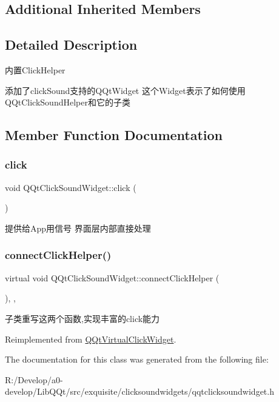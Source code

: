\subsection*{Additional Inherited Members}


\subsection{Detailed Description}
内置\+Click\+Helper

添加了click\+Sound支持的\+Q\+Qt\+Widget 这个\+Widget表示了如何使用\+Q\+Qt\+Click\+Sound\+Helper和它的子类 

\subsection{Member Function Documentation}
\mbox{\label{class_q_qt_click_sound_widget_a0135bb4d2366574b64f3ec2b81474d06}} 
\subsubsection{\texorpdfstring{click}{click}}
{\footnotesize\ttfamily void Q\+Qt\+Click\+Sound\+Widget\+::click (\begin{DoxyParamCaption}{ }\end{DoxyParamCaption})\hspace{0.3cm}{\ttfamily [signal]}}

提供给\+App用信号 界面层内部直接处理 \mbox{\label{class_q_qt_click_sound_widget_abca5602ca11fd5d9f6a4f26d8248e702}} 
\subsubsection{\texorpdfstring{connect\+Click\+Helper()}{connectClickHelper()}}
{\footnotesize\ttfamily virtual void Q\+Qt\+Click\+Sound\+Widget\+::connect\+Click\+Helper (\begin{DoxyParamCaption}{ }\end{DoxyParamCaption})\hspace{0.3cm}{\ttfamily [inline]}, {\ttfamily [protected]}, {\ttfamily [virtual]}}

子类重写这两个函数,实现丰富的click能力 

Reimplemented from \mbox{\hyperlink{class_q_qt_virtual_click_widget_a2e9874c5ec5aba763426dcacb012d7a7}{Q\+Qt\+Virtual\+Click\+Widget}}.



The documentation for this class was generated from the following file\+:\begin{DoxyCompactItemize}
\item 
R\+:/\+Develop/a0-\/develop/\+Lib\+Q\+Qt/src/exquisite/clicksoundwidgets/qqtclicksoundwidget.\+h\end{DoxyCompactItemize}

